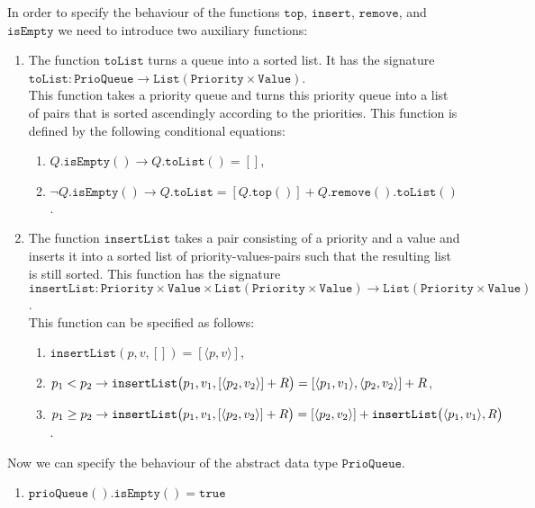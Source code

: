 \begin{Definition}
\begin{enumerate}
      In order to specify the behaviour of the functions $\mathtt{top}$, $\mathtt{insert}$, $\mathtt{remove}$,
      and $\mathtt{isEmpty}$ we need to introduce two auxiliary functions:  
      \begin{enumerate}
      \item The function $\mathtt{toList}$ turns a queue into a sorted list.  It has the signature
            \\[0.2cm]
            \hspace*{1.3cm}
            $\mathtt{toList}: \mathtt{PrioQueue} \rightarrow \mathtt{List}(\mathtt{Priority} \times \mathtt{Value})$.
            \\[0.2cm]
            This function takes a priority queue and turns this priority queue into a list of pairs that is
            sorted ascendingly according to the priorities. This function is defined by the following
            conditional equations: 
            \begin{enumerate}
            \item $Q.\mathtt{isEmpty}() \rightarrow Q.\mathtt{toList}() = []$,
            \item $\neg Q.\mathtt{isEmpty}() \rightarrow Q.\mathtt{toList} = [Q.\mathtt{top}()] + Q.\mathtt{remove}().\mathtt{toList}()$.
            \end{enumerate}
      \item The function $\mathtt{insertList}$ takes a pair consisting of a priority and a value and inserts it
            into a sorted list of priority-values-pairs such that the resulting list is still sorted.
            This function has the signature
            \\[0.2cm]
            \hspace*{-0.8cm}
            $\mathtt{insertList}: \mathtt{Priority} \times \mathtt{Value} \times \mathtt{List}(\mathtt{Priority} \times \mathtt{Value}) 
            \rightarrow \mathtt{List}(\mathtt{Priority} \times \mathtt{Value})$.
            \\[0.2cm]
            This function can be specified as follows:
            \begin{enumerate}
            \item $\mathtt{insertList}(p,v,[]) = [\langle p,v\rangle ]$,
            \item $p_1 <    p_2 \rightarrow \mathtt{insertList}\bigl(p_1,v_1,[\pair(p_2,v_2)] + R\bigr) = [\pair(p_1,v_1), \pair(p_2,v_2)] + R$,
            \item $p_1 \geq p_2 \rightarrow \mathtt{insertList}\bigl(p_1,v_1,[\pair(p_2,v_2)] + R\bigr) = [\pair(p_2,v_2)] + \mathtt{insertList}\bigl(\pair(p_1,v_1), R\bigr)$.
            \end{enumerate}
      \end{enumerate}
      Now we can specify the behaviour of the abstract data type $\mathtt{PrioQueue}$.
      \begin{enumerate}
      \item $\mathtt{prioQueue}().\mathtt{isEmpty}() = \mathtt{true}$


\end{enumerate}
\end{enumerate}
\end{Definition}
